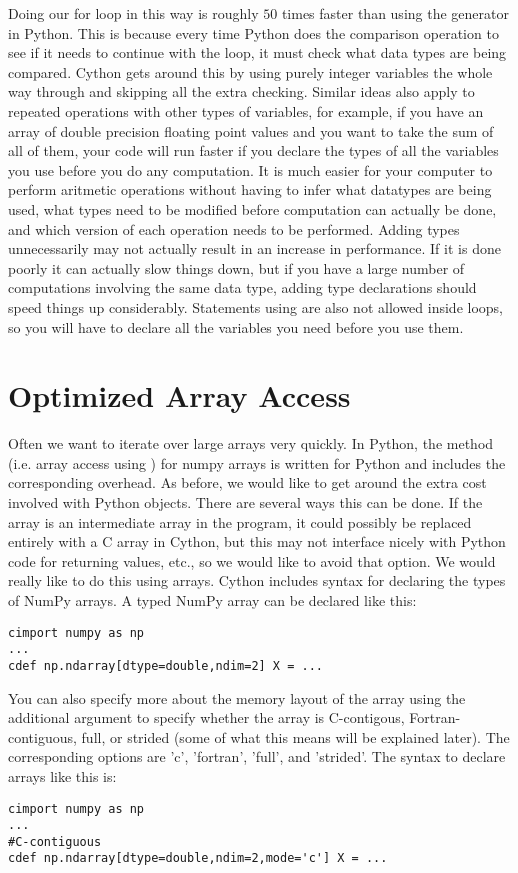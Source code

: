 Doing our for loop in this way is roughly $50$ times faster than using the generator in Python.
This is because every time Python does the comparison operation to see if it needs to continue with the loop, it must check what data types are being compared.
Cython gets around this by using purely integer variables the whole way through and skipping all the extra checking.
Similar ideas also apply to repeated operations with other types of variables, for example, if you have an array of double precision floating point values and you want to take the sum of all of them, your code will run faster if you declare the types of all the variables you use before you do any computation.
It is much easier for your computer to perform aritmetic operations without having to infer what datatypes are being used, what types need to be modified before computation can actually be done, and which version of each operation needs to be performed.
Adding types unnecessarily may not actually result in an increase in performance. If it is done poorly it can actually slow things down, but if you have a large number of computations involving the same data type, adding type declarations should speed things up considerably.
Statements using  are also not allowed inside loops, so you will have to declare all the variables you need before you use them.

\section*{Optimized Array Access}

Often we want to iterate over large arrays very quickly.
In Python, the  method (i.e. array access using \li{[ ]}) for numpy arrays is written for Python and includes the corresponding overhead.
As before, we would like to get around the extra cost involved with Python objects.
There are several ways this can be done.
If the array is an intermediate array in the program, it could possibly be replaced entirely with a C array in Cython, but this may not interface nicely with Python code for returning values, etc., so we would like to avoid that option.
We would really like to do this using arrays.
Cython includes syntax for declaring the types of NumPy arrays.
A typed NumPy array can be declared like this:
\begin{lstlisting}
cimport numpy as np
...
cdef np.ndarray[dtype=double,ndim=2] X = ...
\end{lstlisting}

You can also specify more about the memory layout of the array using the additional argument  to specify whether the array is C-contigous, Fortran-contiguous, full, or strided (some of what this means will be explained later).
The corresponding options are 'c', 'fortran', 'full', and 'strided'.
The syntax to declare arrays like this is:
\begin{lstlisting}
cimport numpy as np
...
#C-contiguous
cdef np.ndarray[dtype=double,ndim=2,mode='c'] X = ...
\end{lstlisting}


